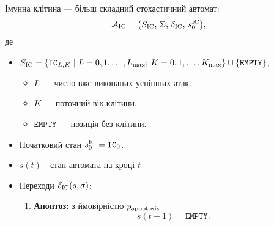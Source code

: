 \documentclass[12pt]{article}
\begin{document}
Імунна клітина — більш складний стохастичний автомат:
\[
\mathcal{A}_{\rm IC} = \bigl(S_{\rm IC},\,\Sigma,\,\delta_{\rm IC},\,s_0^{\rm IC}\bigr),
\]
де
\begin{itemize}
  \item $S_{\rm IC} = \{\mathtt{IC}_{L,K} \mid L=0,1,\dots,L_{\max};\, K=0,1,\dots,K_{\max}\}\cup\{\mathtt{EMPTY}\}$,
    \begin{itemize}
        \item $L$ — число вже виконаних успішних атак.
        \item $K$ — поточний вік клітини.
        \item $\mathtt{EMPTY}$ — позиція без клітини.
    \end{itemize}

  \item Початковий стан $s_0^{\rm IC} = \mathtt{IC}_{0}$.
  \item $s(t)$ - стан автомата на кроці $t$ 
  \item Переходи $\delta_{\rm IC}(s,\sigma)$:
    \begin{enumerate}
      \item {\bfseries Апоптоз:}  
      з ймовірністю $p_{\rm apoptosis}$  
      \[
        s(t+1)=\mathtt{EMPTY}.
      \]
      

\end{enumerate}
\end{itemize}
\end{document}
